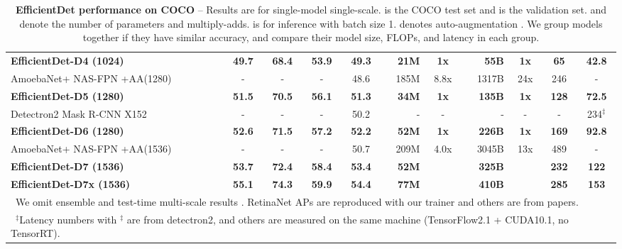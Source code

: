\documentclass[10pt,twocolumn,letterpaper]{article}
\begin{document}
\begin{table}
{\begin{tabular}{l||ccc|c||rcrc||cc}
        \midrule
        \bf EfficientDet-D4  (1024)   & \bf 49.7	& \bf 68.4		& \bf 53.9 	& \bf 49.3 & \bf 21M  &  \bf 1x & \bf  55B  & \bf 1x  & \bf 65      & \bf 42.8 \\
		AmoebaNet+ NAS-FPN +AA(1280)\cite{odaa19} &	-	& - & - & 48.6	 &	185M	&	8.8x	& 1317B		&	24x	&	246 	&	-	\\

        \midrule
        \bf EfficientDet-D5  (1280)   & \bf 51.5	& \bf 70.5		& \bf 56.1 	& \bf 51.3 & \bf 34M  &  \bf 1x & \bf 135B  & \bf 1x  & \bf 128      & \bf 72.5 \\
		Detectron2 Mask R-CNN X152 \cite{detectron2} & - &   - &  - &  50.2 &  -  &  - &  - &  - & - & 234$^\ddag$ \\
        \midrule
        \bf EfficientDet-D6  (1280)   & \bf 52.6	& \bf 71.5		& \bf 57.2 	& \bf 52.2 & \bf 52M  &  \bf 1x  & \bf 226B  & \bf 1x  & \bf 169      & \bf 92.8 \\
       AmoebaNet+ NAS-FPN +AA(1536)\cite{odaa19}	&	- & - & - & 50.7	&	209M	&	4.0x	& 3045B		&	13x		&	489	&	-		\\
        \midrule
        \bf EfficientDet-D7  (1536)   & \bf 53.7	& \bf 72.4		& \bf 58.4	& \bf 53.4 & \bf 52M  &  \bf   & \bf 325B  &   & \bf 232     & \bf 122 \\
        \bf EfficientDet-D7x  (1536)   & \bf 55.1	& \bf 74.3		& \bf 59.9	& \bf 54.4 & \bf 77M  &  \bf   & \bf 410B  &   & \bf285    & \bf 153 \\
		\bottomrule
        \multicolumn{11}{l}{~We omit ensemble and test-time multi-scale results \cite{megdet18,rethinking19}. RetinaNet APs are reproduced with our trainer and others are from papers.} \\
        \multicolumn{11}{l}{~$^\ddag$Latency numbers with $^\ddag$ are  from detectron2, and others are measured on the same machine (TensorFlow2.1 + CUDA10.1, no TensorRT). }
        \end{tabular}
    }

    \caption{
        \textbf{EfficientDet performance on COCO} \cite{coco14} -- Results are for single-model single-scale.   is the COCO test set and  is the validation set.  and  denote the  number of parameters and multiply-adds.  is for inference  with batch size 1.  denotes auto-augmentation \cite{odaa19}. We group models together if they have similar accuracy, and compare their model size, FLOPs, and latency in each group.
       }

    \label{tab:coco}
\end{table}
 
\end{document}
